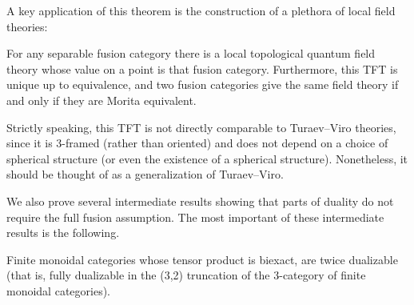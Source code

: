 \documentclass{amsart}
\begin{document}

A key application of this theorem is the construction of a plethora of local field theories:
\begin{corollary}
For any separable fusion category there is a local topological quantum field theory whose value on a point is that fusion category.  Furthermore, this TFT is unique up to equivalence, and two fusion categories give the same field theory if and only if they are Morita equivalent.
\end{corollary}

Strictly speaking, this TFT is not directly comparable to Turaev--Viro theories, since it is $3$-framed (rather than oriented) and does not depend on a choice of spherical structure (or even the existence of a spherical structure).  Nonetheless, it should be thought of as a generalization of Turaev--Viro.


We also prove several intermediate results showing that parts of duality do not require the full fusion assumption.  The most important of these intermediate results is the following.

\begin{theorem}
Finite monoidal categories whose tensor product is biexact, are twice dualizable (that is, fully dualizable in the (3,2) truncation of the $3$-category of finite monoidal categories).
\end{theorem}
\end{document}
